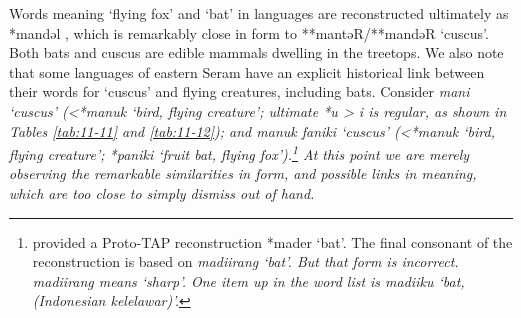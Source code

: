 Words meaning ‘flying fox’
and ‘bat’ in  languages are reconstructed ultimately as *mandəl
\citep[493]{UsherSchapper2022},
 which is remarkably close in form to **mantəR/**mandəR ‘cuscus’.
Both bats and cuscus are edible mammals dwelling in the treetops.
We also note that some languages of eastern Seram have an explicit
historical link between their words for ‘cuscus’
and flying creatures, including bats.
Consider  \it{mani} ‘cuscus’ (<*manuk ‘bird,
flying creature’; ultimate *u > \it{i} is regular,
as shown in Tables \ref{tab:11-11}
and \ref{tab:11-12}); and  \it{manuk faniki} ‘cuscus’ (<*manuk ‘bird,
flying creature’; *paniki ‘fruit bat, flying fox’).\footnote{
		\citet[269]{Schapper2011} provided a Proto-TAP reconstruction *mader ‘bat’.
		The final consonant of the reconstruction is based on  \it{madiirang} ‘bat’.
		But that form is incorrect.
		 \it{madiirang} means ‘sharp’.
		One item up in the word list is \it{madiiku} ‘bat,
		(Indonesian \it{kelelawar})’.}
At this point we are merely observing the remarkable similarities
in form, and possible links in meaning,
which are too close to simply dismiss out of hand.

